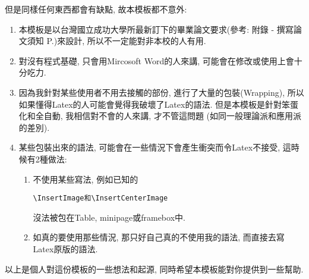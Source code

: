 但是同樣任何東西都會有缺點, 故本模板都不意外:

\begin{enumerate}

  \item
  {
    本模板是以台灣國立成功大學所最新訂下的畢業論文要求(參考: 附錄 - 撰寫論文須知 P.)來設計, 所以不一定能對非本校的人有用.
  } %

  \item
  {
    對沒有程式基礎, 只會用Mircosoft Word的人來講, 可能會在修改或使用上會十分吃力.
  } %

  \item
  {
    因為我針對某些使用者不用去接觸的部份, 進行了大量的包裝(Wrapping), 所以如果懂得Latex的人可能會覺得我破壞了Latex的語法. 但是本模板是針對笨蛋化和全自動, 我相信對不會的人來講, 才不管這問題 (如同一般理論派和應用派的差別).
  } %

  \item
  {
    某些包裝出來的語法, 可能會在一些情況下會產生衝突而令Latex不接受, 這時候有2種做法:
    \begin{enumerate}
      \item
      {
        不使用某些寫法, 例如已知的\begin{verbatim}\InsertImage和\InsertCenterImage\end{verbatim}沒法被包在Table, minipage或framebox中.
      } %

      \item
      {
        如真的要使用那些情況, 那只好自己真的不使用我的語法, 而直接去寫Latex原版的語法.
      } %
    \end{enumerate}
  } %
\end{enumerate}



以上是個人對這份模板的一些想法和起源, 同時希望本模板能對你提供到一些幫助.

\EndChapter

